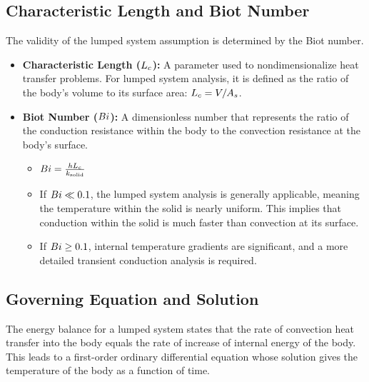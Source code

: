 \subsection{Characteristic Length and Biot Number}
The validity of the lumped system assumption is determined by the Biot number.
\begin{itemize}
    \item \textbf{Characteristic Length ($L_c$):} A parameter used to nondimensionalize heat transfer problems. For lumped system analysis, it is defined as the ratio of the body's volume to its surface area: $L_c = V/A_s$.
    \item \textbf{Biot Number ($Bi$):} A dimensionless number that represents the ratio of the conduction resistance within the body to the convection resistance at the body's surface.
        \begin{itemize}
            \item $Bi = \frac{h L_c}{k_{\text{solid}}}$
            \item If $Bi \ll 0.1$, the lumped system analysis is generally applicable, meaning the temperature within the solid is nearly uniform. This implies that conduction within the solid is much faster than convection at its surface.
            \item If $Bi \ge 0.1$, internal temperature gradients are significant, and a more detailed transient conduction analysis is required.
        \end{itemize}
\end{itemize}

\subsection{Governing Equation and Solution}
The energy balance for a lumped system states that the rate of convection heat transfer into the body equals the rate of increase of internal energy of the body. This leads to a first-order ordinary differential equation whose solution gives the temperature of the body as a function of time.

